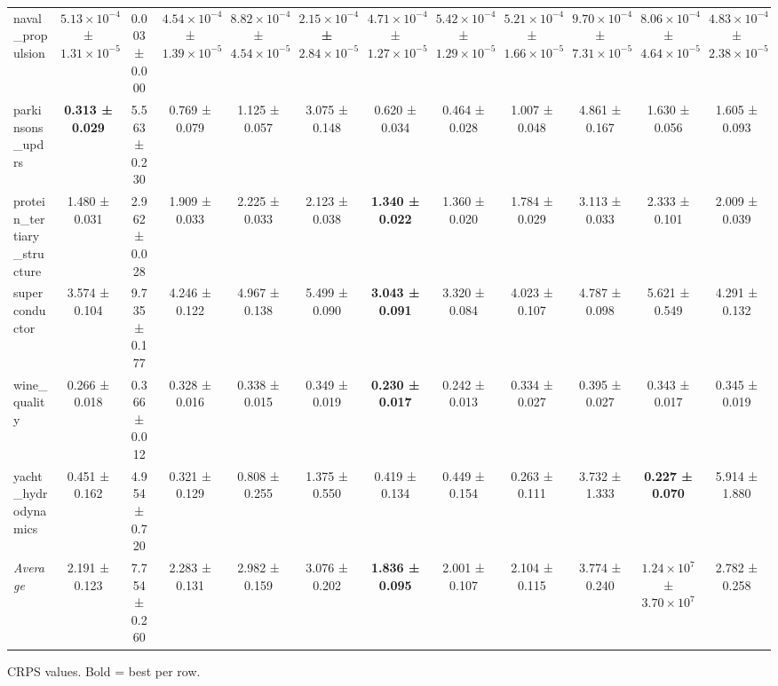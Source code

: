 \begin{table}[htbp]
{\begin{tabular}{lccccccccccc}
naval\_propulsion & $5.13\times10^{-4}$ ± $1.31\times10^{-5}$ & 0.003 ± 0.000 & $4.54\times10^{-4}$ ± $1.39\times10^{-5}$ & $8.82\times10^{-4}$ ± $4.54\times10^{-5}$ & \textbf{$2.15\times10^{-4}$ ± $2.84\times10^{-5}$} & $4.71\times10^{-4}$ ± $1.27\times10^{-5}$ & $5.42\times10^{-4}$ ± $1.29\times10^{-5}$ & $5.21\times10^{-4}$ ± $1.66\times10^{-5}$ & $9.70\times10^{-4}$ ± $7.31\times10^{-5}$ & $8.06\times10^{-4}$ ± $4.64\times10^{-5}$ & $4.83\times10^{-4}$ ± $2.38\times10^{-5}$ \\
parkinsons\_updrs & \textbf{0.313 ± 0.029} & 5.563 ± 0.230 & 0.769 ± 0.079 & 1.125 ± 0.057 & 3.075 ± 0.148 & 0.620 ± 0.034 & 0.464 ± 0.028 & 1.007 ± 0.048 & 4.861 ± 0.167 & 1.630 ± 0.056 & 1.605 ± 0.093 \\
protein\_tertiary\_structure & 1.480 ± 0.031 & 2.962 ± 0.028 & 1.909 ± 0.033 & 2.225 ± 0.033 & 2.123 ± 0.038 & \textbf{1.340 ± 0.022} & 1.360 ± 0.020 & 1.784 ± 0.029 & 3.113 ± 0.033 & 2.333 ± 0.101 & 2.009 ± 0.039 \\
superconductor & 3.574 ± 0.104 & 9.735 ± 0.177 & 4.246 ± 0.122 & 4.967 ± 0.138 & 5.499 ± 0.090 & \textbf{3.043 ± 0.091} & 3.320 ± 0.084 & 4.023 ± 0.107 & 4.787 ± 0.098 & 5.621 ± 0.549 & 4.291 ± 0.132 \\
wine\_quality & 0.266 ± 0.018 & 0.366 ± 0.012 & 0.328 ± 0.016 & 0.338 ± 0.015 & 0.349 ± 0.019 & \textbf{0.230 ± 0.017} & 0.242 ± 0.013 & 0.334 ± 0.027 & 0.395 ± 0.027 & 0.343 ± 0.017 & 0.345 ± 0.019 \\
yacht\_hydrodynamics & 0.451 ± 0.162 & 4.954 ± 0.720 & 0.321 ± 0.129 & 0.808 ± 0.255 & 1.375 ± 0.550 & 0.419 ± 0.134 & 0.449 ± 0.154 & 0.263 ± 0.111 & 3.732 ± 1.333 & \textbf{0.227 ± 0.070} & 5.914 ± 1.880 \\
\midrule
\textit{Average} & 2.191 ± 0.123 & 7.754 ± 0.260 & 2.283 ± 0.131 & 2.982 ± 0.159 & 3.076 ± 0.202 & \textbf{1.836 ± 0.095} & 2.001 ± 0.107 & 2.104 ± 0.115 & 3.774 ± 0.240 & $1.24\times10^{7}$ ± $3.70\times10^{7}$ & 2.782 ± 0.258 \\
\bottomrule
\end{tabular}
}
\par\smallskip\footnotesize{CRPS values. Bold = best per row.}
\end{table}

